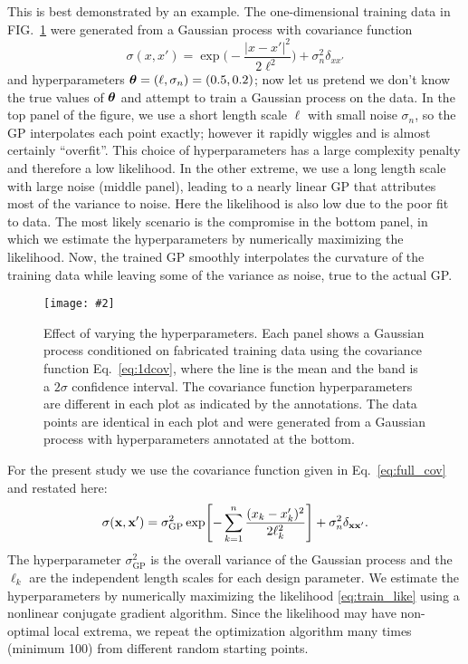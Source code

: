 \documentclass[aps,prc,reprint,superscriptaddress,amsmath]{revtex4-1}
\newcommand{\colfig}[3][t]{
  \begin{figure}[#1]
    \texttt{[image: \#2]}
    \caption{\label{fig:#2}#3}
  \end{figure}
}
\begin{document}
This is best demonstrated by an example.
The one-dimensional training data in FIG.~\ref{fig:training} were generated from a Gaussian process with covariance function
\begin{equation}
  \sigma(x, x') = \exp\biggl( -\frac{|x - x'|^2}{2\ell^2} \biggr) + \sigma_n^2\delta_{xx'}
  \label{eq:1dcov}
\end{equation}
and hyperparameters $\boldsymbol\theta = (\ell, \sigma_n) = (0.5, 0.2)$; now let us pretend we don't know the true values of $\boldsymbol\theta$ and attempt to train a Gaussian process on the data.
In the top panel of the figure, we use a short length scale $\ell$ with small noise $\sigma_n$, so the GP interpolates each point exactly; however it rapidly wiggles and is almost certainly ``overfit''.
This choice of hyperparameters has a large complexity penalty and therefore a low likelihood.
In the other extreme, we use a long length scale with large noise (middle panel), leading to a nearly linear GP that attributes most of the variance to noise.
Here the likelihood is also low due to the poor fit to data.
The most likely scenario is the compromise in the bottom panel, in which we estimate the hyperparameters by numerically maximizing the likelihood.
Now, the trained GP smoothly interpolates the curvature of the training data while leaving some of the variance as noise, true to the actual GP.

\colfig{training}{
  Effect of varying the hyperparameters.
  Each panel shows a Gaussian process conditioned on fabricated training data using the covariance function Eq.~\eqref{eq:1dcov}, where the line is the mean and the band is a $2\sigma$ confidence interval.
  The covariance function hyperparameters are different in each plot as indicated by the annotations.
  The data points are identical in each plot and were generated from a Gaussian process with hyperparameters annotated at the bottom.
}

For the present study we use the covariance function given in Eq.~\eqref{eq:full_cov} and restated here:
\begin{equation*}
  \sigma(\mathbf x, \mathbf x') = \sigma_\text{GP}^2 \exp\Biggl[ -\sum_{k=1}^n \frac{(x_k - x'_k)^2}{2\ell_k^2} \Biggr] + \sigma_n^2\delta_{\mathbf x\mathbf x'}.
\end{equation*}
The hyperparameter $\sigma^2_\text{GP}$ is the overall variance of the Gaussian process and the $\ell_k$ are the independent length scales for each design parameter.
We estimate the hyperparameters by numerically maximizing the likelihood \eqref{eq:train_like} using a nonlinear conjugate gradient algorithm.
Since the likelihood may have non-optimal local extrema, we repeat the optimization algorithm many times (minimum 100) from different random starting points.
\end{document}

